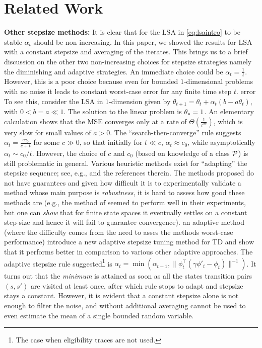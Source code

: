 \section{Related Work}\label{sec:related}
\textbf{Other stepsize methods:} 
It is clear that for the LSA in \eqref{eq:lsaintro} to be stable $\alpha_t$ should be non-increasing. In this paper, we showed the results for LSA with a constant stepsize and averaging of the iterates.  This brings us to a brief discussion on the other two non-increasing choices for stepsize strategies namely the diminishing and adaptive strategies.
An immediate choice could be $\alpha_t=\frac{1}{t}$.
However, this is a poor choice because even for bounded
$1$-dimensional problems with no noise it leads to constant worst-case error for any finite time step $t$.
error 
To see this, consider the LSA in $1$-dimension given by $\theta_{t+1}=\theta_t+\alpha_t(b-a\theta_t)$, with $0<b=a\ll 1$. The solution to the linear  problem is $\theta_*=1$.
An elementary calculation shows that the MSE converges only at a rate of $\Theta(\frac{1}{t^{2a}})$, which is very slow for small values of $a>0$. The ``search-then-converge'' rule suggests 
$\alpha_t=\frac{cc_0}{c+t}$ for some $c\gg 0$, so that initially for $t \ll c$, $\alpha_t \approx c_0$, while asymptotically $\alpha_t \sim c_0/t$. 
However, the choice of $c$ and $c_0$ (based on knowledge of a class $\mathcal{P}$) is still problematic in general.
\fi
Various heuristic methods exist for ``adapting'' the stepsize sequence; see, e.g., \cite{dab} and the references therein.
The methods proposed do not have guarantees and given how difficult it is to experimentally validate a method
whose main purpose is \emph{robustness}, it is hard to assess how good these methods are
(e.g., the method of \citet{dab} seemed to perform well in their experiments, but one can \emph{show} that for finite state spaces it eventually settles on a constant step-size and hence it will fail to guarantee convergence).
an adaptive method (where the difficulty comes from the need to asses the methods worst-case performance)
\citet{dab} introduce a new adaptive stepsize tuning method for TD and show that it performs better in comparison to various other adaptive approaches. The adaptive stepsize rule suggested\footnote{The case when eligibility traces are not used.} is $\alpha_t=\min(\alpha_{t-1},\parallel\phi^\top_t(\gamma\phi'_t-\phi_t)\parallel^{-1})$. It turns out that the \emph{minimum} is attained as soon as all the states transition pairs $(s,s')$ are visited at least once, after which rule stops to adapt and stepsize stays a constant. However, it is evident that a constant stepsize alone is not enough to filter the noise, and without additional averaging cannot be used to even estimate the mean of a single bounded random variable. 
\fi

